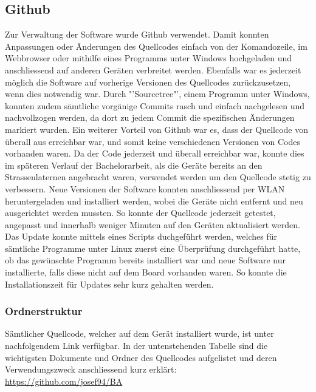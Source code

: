 \subsection{Github}
Zur Verwaltung der Software wurde Github verwendet. Damit konnten Anpassungen oder Änderungen des Quellcodes einfach von der Komandozeile, im Webbrowser oder mithilfe eines Programms unter Windows hochgeladen und anschliessend auf anderen Geräten verbreitet werden. Ebenfalls war es jederzeit möglich die Software auf vorherige Versionen des Quellcodes zurückzusetzen, wenn dies notwendig war. Durch "'Sourcetree"', einem Programm unter Windows, konnten zudem sämtliche vorgänige Commits rasch und einfach nachgelesen und nachvollzogen werden, da dort zu jedem Commit die spezifischen Änderungen markiert wurden. Ein weiterer Vorteil von Github war es, dass der Quellcode von überall aus erreichbar war, und somit keine verschiedenen Versionen von Codes vorhanden waren. Da der Code jederzeit und überall erreichbar war, konnte dies im späteren Verlauf der Bachelorarbeit, als die Geräte bereits an den Strassenlaternen angebracht waren, verwendet werden um den Quellcode stetig zu verbessern. Neue Versionen der Software konnten anschliessend per WLAN heruntergeladen und installiert werden, wobei die Geräte nicht entfernt und neu ausgerichtet werden mussten. So konnte der Quellcode jederzeit getestet, angepasst und innerhalb weniger Minuten auf den Geräten aktualisiert werden. Das Update konnte mittels eines Scripts duchgeführt werden, welches für sämtliche Programme unter Linux zuerst eine Überprüfung durchgeführt hatte, ob das gewünschte Programm bereits installiert war und neue Software nur installierte, falls diese nicht auf dem Board vorhanden waren. So konnte die Installationszeit für Updates sehr kurz gehalten werden.

\subsubsection{Ordnerstruktur}
Sämtlicher Quellcode, welcher auf dem Gerät installiert wurde, ist unter nachfolgendem Link verfügbar. In der untenstehenden Tabelle sind die wichtigsten Dokumente und Ordner des Quellcodes aufgelistet und deren Verwendungszweck anschliessend kurz erklärt:\\

\url{https://github.com/josef94/BA}\\

\setlength\tabcolsep{5pt}

